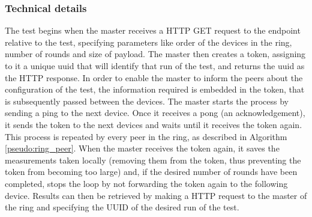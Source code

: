\subsubsection{Technical details}The test begins when the master receives a HTTP GET request to the endpoint relative to the test, specifying parameters like order of the devices in the ring, number of rounds and size of payload. The master then creates a token, assigning to it a unique uuid that will identify that run of the test, and returns the uuid as the HTTP response.
In order to enable the master to inform the peers about the configuration of the test, the information required is embedded in the token, that is subsequently passed between the devices.
The master starts the process by sending a ping to the next device. Once it receives a pong (an acknowledgement), it sends the token to the next devices and waits until it receives the token again. 
This process is repeated by every peer in the ring, as described in Algorithm \ref{pseudo:ring_peer}.
When the master receives the token again, it saves the measurements taken locally (removing them from the token, thus preventing the token from becoming too large) and, if the desired number of rounds have been completed, stops the loop by not forwarding the token again to the following device.
Results can then be retrieved by making a HTTP request to the master of the ring and specifying the UUID of the desired run of the test.

